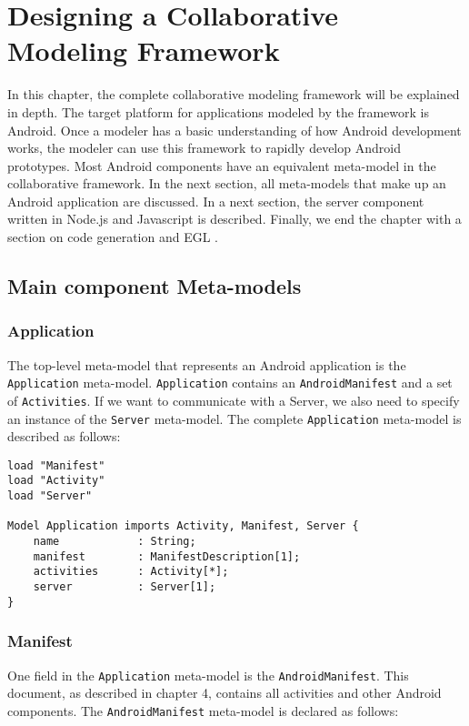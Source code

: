 \chapter{Designing a Collaborative Modeling Framework}

In this chapter, the complete collaborative modeling framework will be explained in depth. The target platform for applications modeled by the framework is Android. Once a modeler has a basic understanding of how Android development works, the modeler can use this framework to rapidly develop Android prototypes. Most Android components have an equivalent meta-model in the collaborative framework. In the next section, all meta-models that make up an Android application are discussed. In a next section, the server component written in Node.js \cite{NodeJS} and Javascript is described. Finally, we end the chapter with a section on code generation and EGL \cite{EGL}.

\section{Main component Meta-models}

\subsection{Application}

The top-level meta-model that represents an Android application is the \texttt{Application} meta-model. \texttt{Application} contains an \texttt{AndroidManifest} and a set of \texttt{Activities}. If we want to communicate with a Server, we also need to specify an instance of the \texttt{Server} meta-model. The complete \texttt{Application} meta-model is described as follows:

\begin{lstlisting}[label=application-mm,caption=Application meta-model, captionpos=t]
load "Manifest"
load "Activity"
load "Server"

Model Application imports Activity, Manifest, Server {
	name			: String;
	manifest		: ManifestDescription[1];
	activities		: Activity[*];
	server 			: Server[1];
}
\end{lstlisting}

\subsection{Manifest}

One field in the \texttt{Application} meta-model is the \texttt{AndroidManifest}. This document, as described in chapter 4, contains all activities and other Android components. The \texttt{AndroidManifest} meta-model is declared as follows:

